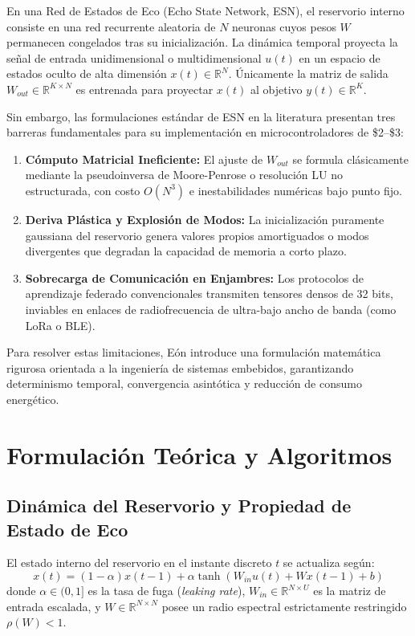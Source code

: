 \documentclass[10pt,twocolumn]{article}
\begin{document}
En una Red de Estados de Eco (Echo State Network, ESN), el reservorio interno consiste en una red recurrente aleatoria de $N$ neuronas cuyos pesos $W$ permanecen congelados tras su inicialización. La dinámica temporal proyecta la señal de entrada unidimensional o multidimensional $u(t)$ en un espacio de estados oculto de alta dimensión $x(t) \in \mathbb{R}^N$. Únicamente la matriz de salida $W_{out} \in \mathbb{R}^{K \times N}$ es entrenada para proyectar $x(t)$ al objetivo $y(t) \in \mathbb{R}^K$.

Sin embargo, las formulaciones estándar de ESN en la literatura presentan tres barreras fundamentales para su implementación en microcontroladores de \$2--\$3:
\begin{enumerate}
    \item \textbf{Cómputo Matricial Ineficiente:} El ajuste de $W_{out}$ se formula clásicamente mediante la pseudoinversa de Moore-Penrose o resolución LU no estructurada, con costo $O(N^3)$ e inestabilidades numéricas bajo punto fijo.
    \item \textbf{Deriva Plástica y Explosión de Modos:} La inicialización puramente gaussiana del reservorio genera valores propios amortiguados o modos divergentes que degradan la capacidad de memoria a corto plazo.
    \item \textbf{Sobrecarga de Comunicación en Enjambres:} Los protocolos de aprendizaje federado convencionales transmiten tensores densos de 32 bits, inviables en enlaces de radiofrecuencia de ultra-bajo ancho de banda (como LoRa o BLE).
\end{enumerate}

Para resolver estas limitaciones, Eón introduce una formulación matemática rigurosa orientada a la ingeniería de sistemas embebidos, garantizando determinismo temporal, convergencia asintótica y reducción de consumo energético.

\section{Formulación Teórica y Algoritmos}

\subsection{Dinámica del Reservorio y Propiedad de Estado de Eco}

El estado interno del reservorio en el instante discreto $t$ se actualiza según:
\begin{equation}
x(t) = (1 - \alpha) x(t-1) + \alpha \tanh\left( W_{in} u(t) + W x(t-1) + b \right)
\label{eq:esn_state}
\end{equation}
donde $\alpha \in (0, 1]$ es la tasa de fuga (\textit{leaking rate}), $W_{in} \in \mathbb{R}^{N \times U}$ es la matriz de entrada escalada, y $W \in \mathbb{R}^{N \times N}$ posee un radio espectral estrictamente restringido $\rho(W) < 1$.
\end{document}
